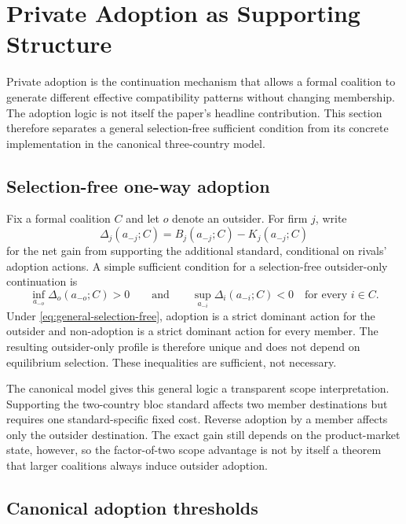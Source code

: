 \section{Private Adoption as Supporting Structure}
\label{sec:private-compatibility}

Private adoption is the continuation mechanism that allows a formal coalition to generate different effective compatibility patterns without changing membership. The adoption logic is not itself the paper's headline contribution. This section therefore separates a general selection-free sufficient condition from its concrete implementation in the canonical three-country model.

\subsection{Selection-free one-way adoption}
\label{subsec:private-general}

Fix a formal coalition $C$ and let $o$ denote an outsider. For firm $j$, write
\[
\Delta_j(a_{-j};C)
=
B_j(a_{-j};C)-K_j(a_{-j};C)
\]
for the net gain from supporting the additional standard, conditional on rivals' adoption actions. A simple sufficient condition for a selection-free outsider-only continuation is
\begin{equation}
    \inf_{a_{-o}}\Delta_o(a_{-o};C)>0
    \qquad\text{and}\qquad
    \sup_{a_{-i}}\Delta_i(a_{-i};C)<0
    \quad\text{for every }i\in C.
    \label{eq:general-selection-free}
\end{equation}
Under \eqref{eq:general-selection-free}, adoption is a strict dominant action for the outsider and non-adoption is a strict dominant action for every member. The resulting outsider-only profile is therefore unique and does not depend on equilibrium selection. These inequalities are sufficient, not necessary.

The canonical model gives this general logic a transparent scope interpretation. Supporting the two-country bloc standard affects two member destinations but requires one standard-specific fixed cost. Reverse adoption by a member affects only the outsider destination. The exact gain still depends on the product-market state, however, so the factor-of-two scope advantage is not by itself a theorem that larger coalitions always induce outsider adoption.

\subsection{Canonical adoption thresholds}
\label{subsec:private-thresholds}

